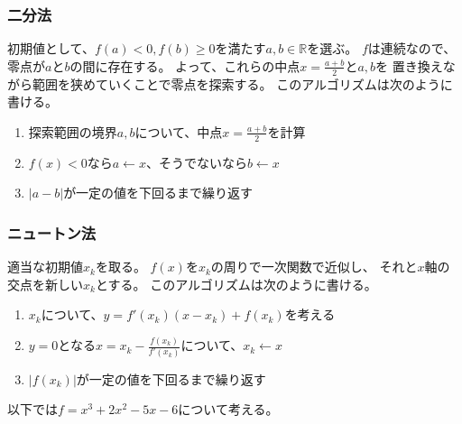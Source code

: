 \documentclass[a4j, titlepage]{jsarticle}
\numberwithin{equation}{section}
\begin{document}
        \subsubsection{二分法}
            初期値として、$f(a) < 0, f(b) \geq 0$を満たす$a, b \in \mathbb{R}$を選ぶ。
            $f$は連続なので、零点が$a$と$b$の間に存在する。
            よって、これらの中点$\displaystyle x=\frac{a+b}{2}$と$a, b$を
            置き換えながら範囲を狭めていくことで零点を探索する。
            このアルゴリズムは次のように書ける。
            \begin{enumerate}
                \item 探索範囲の境界$a, b$について、中点$x=\displaystyle\frac{a+b}{2}$を計算
                \item $f(x)<0$なら$a \leftarrow x$、そうでないなら$b\leftarrow x$
                \item $|a-b|$が一定の値を下回るまで繰り返す
            \end{enumerate}

        \subsubsection{ニュートン法}
            適当な初期値$x_k$を取る。
            $f(x)$を$x_k$の周りで一次関数で近似し、
            それと$x$軸の交点を新しい$x_k$とする。
            このアルゴリズムは次のように書ける。
            \begin{enumerate}
                \item $x_k$について、$y=f'(x_k)(x-x_k)+f(x_k)$を考える
                \item $y=0$となる$x=x_k-\displaystyle\frac{f(x_k)}{f'(x_k)}$について、$x_k\leftarrow x$
                \item $|f(x_k)|$が一定の値を下回るまで繰り返す
            \end{enumerate}

        以下では$f=x^3+2x^2-5x-6$について考える。
\end{document}
